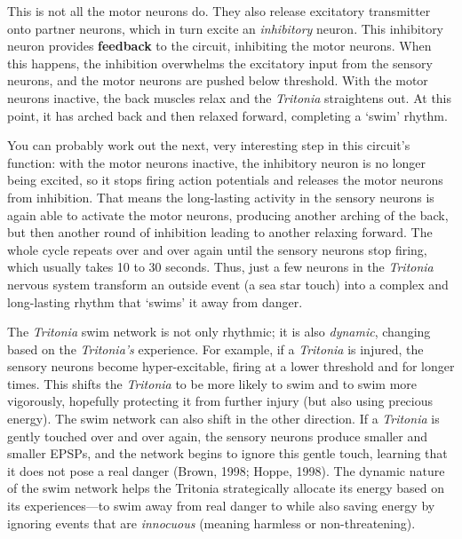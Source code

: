 \documentclass[
]{book}
\begin{document}
This is not all the motor neurons do. They also release excitatory transmitter onto partner neurons, which in turn excite an \emph{inhibitory} neuron. This inhibitory neuron provides \textbf{feedback} to the circuit, inhibiting the motor neurons. When this happens, the inhibition overwhelms the excitatory input from the sensory neurons, and the motor neurons are pushed below threshold. With the motor neurons inactive, the back muscles relax and the \emph{Tritonia} straightens out. At this point, it has arched back and then relaxed forward, completing a `swim' rhythm.

You can probably work out the next, very interesting step in this circuit's function: with the motor neurons inactive, the inhibitory neuron is no longer being excited, so it stops firing action potentials and releases the motor neurons from inhibition. That means the long-lasting activity in the sensory neurons is again able to activate the motor neurons, producing another arching of the back, but then another round of inhibition leading to another relaxing forward. The whole cycle repeats over and over again until the sensory neurons stop firing, which usually takes 10 to 30 seconds. Thus, just a few neurons in the \emph{Tritonia} nervous system transform an outside event (a sea star touch) into a complex and long-lasting rhythm that `swims' it away from danger.

The \emph{Tritonia} swim network is not only rhythmic; it is also \emph{dynamic}, changing based on the \emph{Tritonia's} experience. For example, if a \emph{Tritonia} is injured, the sensory neurons become hyper-excitable, firing at a lower threshold and for longer times. This shifts the \emph{Tritonia} to be more likely to swim and to swim more vigorously, hopefully protecting it from further injury (but also using precious energy). The swim network can also shift in the other direction. If a \emph{Tritonia} is gently touched over and over again, the sensory neurons produce smaller and smaller EPSPs, and the network begins to ignore this gentle touch, learning that it does not pose a real danger (Brown, 1998; Hoppe, 1998). The dynamic nature of the swim network helps the Tritonia strategically allocate its energy based on its experiences---to swim away from real danger to while also saving energy by ignoring events that are \emph{innocuous} (meaning harmless or non-threatening).
\end{document}
